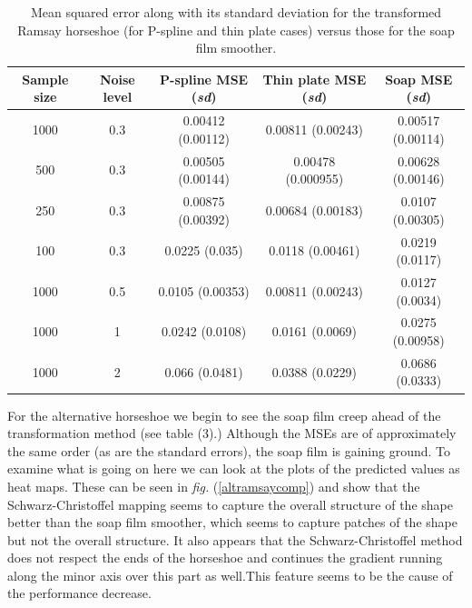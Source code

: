 \documentclass[a4paper,10pt]{amsart}
\newcommand{\sch}{Schwarz-Christoffel }
\newcommand{\fig}[1]{\emph{fig.} (\ref{#1})}
\begin{document}
\begin{table}[ht]
\begin{tabular}{c c c c c}\\
Sample size & Noise level & P-spline MSE (\emph{sd}) & Thin plate MSE (\emph{sd}) & Soap MSE (\emph{sd}) \\
\hline
\hline
1000 & 0.3 & 0.00412 (0.00112) & 0.00811 (0.00243) & 0.00517 (0.00114) \\ 
500 & 0.3 & 0.00505 (0.00144) & 0.00478 (0.000955) & 0.00628 (0.00146) \\ 
250 & 0.3 & 0.00875 (0.00392) & 0.00684 (0.00183) & 0.0107 (0.00305) \\ 
100 & 0.3 & 0.0225 (0.035) & 0.0118 (0.00461) & 0.0219 (0.0117) \\ 
1000 & 0.5 & 0.0105 (0.00353) & 0.00811 (0.00243) & 0.0127 (0.0034) \\ 
1000 & 1 & 0.0242 (0.0108) & 0.0161 (0.0069) & 0.0275 (0.00958) \\ 
1000 & 2 & 0.066 (0.0481) & 0.0388 (0.0229) & 0.0686 (0.0333) \\ 
\end{tabular}
\label{table2}
\caption{Mean squared error along with its standard deviation for the transformed Ramsay horseshoe (for P-spline and thin plate cases) versus those for the soap film smoother.}
\end{table}

For the alternative horseshoe we begin to see the soap film creep ahead of the transformation method (see table (3).) Although the MSEs are of approximately the same order (as are the standard errors), the soap film is gaining ground. To examine what is going on here we can look at the plots of the predicted values as heat maps. These can be seen in \fig{altramsaycomp} and show that the \sch mapping seems to capture the overall structure of the shape better than the soap film smoother, which seems to capture patches of the shape but not the overall structure. It also appears that the \sch method does not respect the ends of the horseshoe and continues the gradient running along the minor axis over this part as well.This feature seems to be the cause of the performance decrease.
\end{document}
